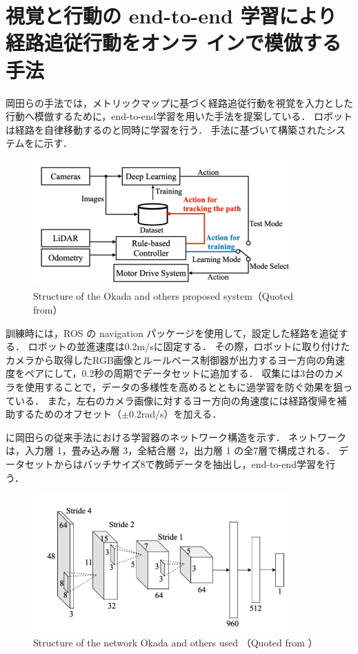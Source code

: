 \section{視覚と行動の end-to-end 学習により経路追従行動をオンラ
インで模倣する手法}
岡田らの手法では，メトリックマップに基づく経路追従行動を視覚を入力とした行動へ模倣するために，end-to-end学習を用いた手法を提案している．
ロボットは経路を自律移動するのと同時に学習を行う．
手法に基づいて構築されたシステムをに示す．

\begin{figure}[htbp]
  \centering
   \includegraphics[width=100mm]{images/pdf/okada/method_sys.pdf}
   \caption[Structure of the Okada and others proposed system]{Structure of the Okada and others proposed system（Quoted from\cite{okada2020}）}
   \label{fig:okada_sys}
\end{figure}
訓練時には，ROS の navigation パッケージを使用して，設定した経路を追従する．
ロボットの並進速度は0.2m/sに固定する．
その際，ロボットに取り付けたカメラから取得したRGB画像とルールベース制御器が出力するヨー方向の角速度をペアにして，0.2秒の周期でデータセットに追加する．
収集には3台のカメラを使用することで，データの多様性を高めるとともに過学習を防ぐ効果を狙っている．
また，左右のカメラ画像に対するヨー方向の角速度には経路復帰を補助するためのオフセット（\(\pm 0.2\)rad/s）を加える．

に岡田らの従来手法における学習器のネットワーク構造を示す．
ネットワークは，入力層 1，畳み込み層 3，全結合層 2，出力層 1 の全7層で構成される．
データセットからはバッチサイズ8で教師データを抽出し，end-to-end学習を行う．

\begin{figure}[htbp]
    \centering
     \includegraphics[width=100mm]{images/pdf/okada/network.pdf}
     \caption{Structure of the network Okada and others used （Quoted from \cite{okada2020}）}
     \label{fig:okada_net}
\end{figure}


